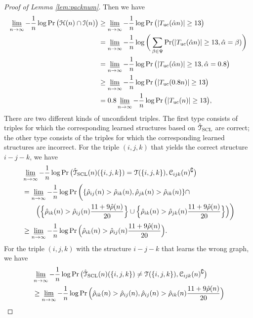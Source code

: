 \begin{proof}[Proof of Lemma \ref{lem:packnum}]
	Then we have
	\begin{align}
		\varliminf_{n\rightarrow\infty}-\frac{1}{n}\log\Pr\big(\mathcal{H}(n)\cap \mathcal{I}(n)\big)&\geq \varliminf_{n\rightarrow\infty}-\frac{1}{n}\log\Pr\big(|T_{{\rm uc}}(\hat{\alpha} n)|\geq 13\big)\\
		&=\varliminf_{n\rightarrow\infty}-\frac{1}{n}\log\bigg(\sum_{\beta\in\Psi}\Pr(|T_{{\rm uc}}(\hat{\alpha} n)|\geq 13,\hat{\alpha}=\beta)\bigg)\\
		&=\varliminf_{n\rightarrow\infty}-\frac{1}{n}\log\Pr\big(|T_{{\rm uc}}(\hat{\alpha} n)|\geq 13,\hat{\alpha}=0.8\big)\\
		&\geq \varliminf_{n\rightarrow\infty}-\frac{1}{n}\log\Pr \big(|T_{{\rm uc}}(0.8 n)|\geq 13\big)\\
		&=0.8 \varliminf_{n\rightarrow\infty}-\frac{1}{n}\log\Pr\big(|T_{{\rm uc}}(n)|\geq 13\big),
	\end{align}
	There are two different kinds of unconfident triples. The first type consists of  triples for which the corresponding learned structures based on $\hat{\mathcal{T}}_{{\rm SCL}}$ are correct; the other type consists of the triples for which the corresponding learned structures are incorrect. For the triple $(i,j,k)$ that yields the correct    structure $i-j-k$, we have
	\begin{align}
		&\varliminf_{n\rightarrow\infty}-\frac{1}{n}\log\Pr\big(\hat{\mathcal{T}}_{{\rm SCL}}(n)(\{i,j,k\})=\mathcal{T}(\{i,j,k\}),\mathcal{C}_{ijk}(n)^{\complement}\big)\nonumber\\
		&=\varliminf_{n\rightarrow\infty}-\frac{1}{n}\log\Pr\bigg(\{\hat{\rho}_{ij}( n)>\hat{\rho}_{ik}( n),\hat{\rho}_{jk}( n)>\hat{\rho}_{ik}( n)\}\cap \nonumber\\*
		& \qquad\Big(\Big\{\hat{\rho}_{ik}( n)>\hat{\rho}_{ij}( n)\frac{11+9\hat{\rho}( n)}{20}\Big\}\cup\Big\{\hat{\rho}_{ik}( n)>\hat{\rho}_{jk}( n)\frac{11+9\hat{\rho}( n)}{20}\Big\}\Big)\bigg)\\
		&\geq \varliminf_{n\rightarrow\infty}-\frac{1}{n}\log\Pr\Big(\hat{\rho}_{ik}( n)>\hat{\rho}_{ij}( n)\frac{11+9\hat{\rho}( n)}{20}\Big).
	\end{align}
	For the triple $(i,j,k)$ with the  structure $i-j-k$ that learns the wrong graph, we have
	\begin{align}
		&\varliminf_{n\rightarrow\infty}-\frac{1}{n}\log\Pr\big(\hatcalT_{{\rm SCL}}(n)(\{i,j,k\})\neq \calT(\{i,j,k\}),\calC_{ijk}(n)^{\complement}\big)\nonumber\\
		&\geq\varliminf_{n\rightarrow\infty}-\frac{1}{n}\log\Pr\Big(\hrho_{ik}( n)>\hrho_{ij}( n),\hrho_{ij}( n)>\hrho_{ik}( n)\frac{11+9\hrho( n)}{20}\Big)\\

\end{align}
\end{proof}
